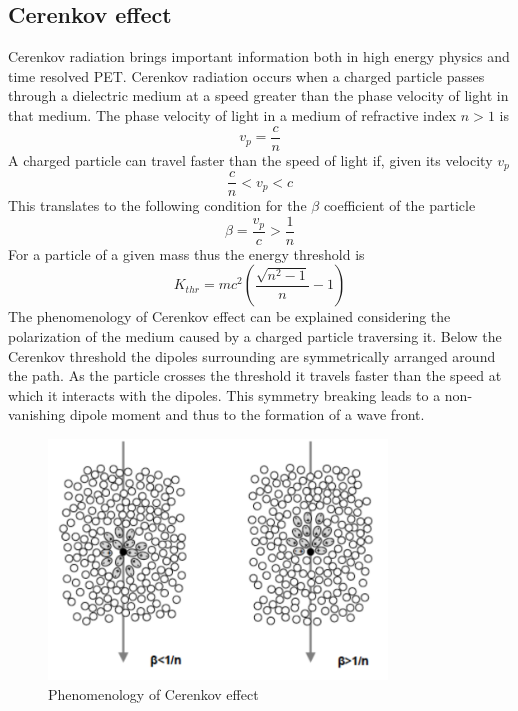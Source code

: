 \subsection{Cerenkov effect}
Cerenkov radiation brings important information both in high energy physics and time resolved PET.
Cerenkov radiation occurs when a charged particle passes through a dielectric medium at a speed greater than the phase velocity of light in that medium.
The phase velocity of light in a medium of refractive index $n > 1$ is
\begin{equation}
v_{p} = \frac{c}{n}
\end{equation}
A charged particle can travel faster than the speed of light if, given its velocity $v_{p}$ 
\begin{equation}
\frac{c}{n} < v_{p} < c
\end{equation}
This translates to the following condition for the $\beta$ coefficient of the particle
\begin{equation}
\beta = \frac{v_{p}}{c} > \frac{1}{n}
\end{equation}
For a particle of a given mass thus the energy threshold is
\begin{equation}
K_{thr} = mc^{2}\left( \frac{\sqrt {n^{2}-1}}{n} - 1 \right)
\label{eq:thr}
\end{equation}
The phenomenology of Cerenkov effect can be explained considering the polarization of the medium caused by a charged particle traversing it.
Below the Cerenkov threshold the dipoles surrounding are symmetrically arranged around the path. As the particle crosses the threshold it travels faster than the speed at which it interacts with the dipoles. This symmetry breaking leads to a non-vanishing dipole moment and thus to the formation of a wave front.

\begin{figure}
\centering
\includegraphics[width=9cm]{../Pictures/Chapter_2/cerenkov.pdf}
\caption[Cerenkov effect]{Phenomenology of Cerenkov effect}
\label{fig:cerenkov}
\end{figure}

